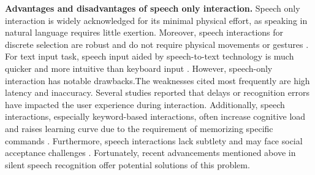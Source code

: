 \documentclass[review]{fcs}
\newcommand{\revise}[2]{\textcolor[rgb]{0,0,0}{#2}}
\begin{document}
\textbf{Advantages and disadvantages of speech only interaction.} Speech only interaction is widely acknowledged for its minimal physical effort, as speaking in natural language requires little exertion\cite{DBLP:conf/vr/HombeckVHDL23}. 
\revise{Moreover, speech interactions for discrete selection are robust and require no physical movements or gestures \cite{DBLP:conf/ismar/ChenGFCL23}.For text input, speech aided by speech-to-text technology is much quicker and more intuitive than keyboard input \cite{DBLP:conf/vr/HombeckVHDL23}.}{Moreover, speech interactions for discrete selection are robust and do not require physical movements or gestures \cite{DBLP:conf/ismar/ChenGFCL23}. For text input task, speech input aided by speech-to-text technology is much quicker and more intuitive than keyboard input \cite{DBLP:conf/vr/HombeckVHDL23}.} However, speech-only interaction has notable drawbacks.\revise{The most frequently cited weaknesses are latency and inaccuracy.}{The weaknesses cited most frequently are high latency and inaccuracy.} 
\revise{Several studies reported that delays or recognition errors have impacted the user experience during the interaction\cite{DBLP:conf/vr/HombeckVHDL23, DBLP:conf/vr/SaintAubertAMPAL23, DBLP:conf/vr/JingLB22, DBLP:conf/ismar/MengXL22, DBLP:conf/uist/LiaoKJKS22}.}{Several studies\cite{DBLP:conf/vr/HombeckVHDL23, DBLP:conf/vr/SaintAubertAMPAL23, DBLP:conf/vr/JingLB22, DBLP:conf/ismar/MengXL22, DBLP:conf/uist/LiaoKJKS22} reported that delays or recognition errors have impacted the user experience during interaction.} Additionally, speech interactions, especially keyword-based interactions, often increase cognitive load and raises learning curve due to the requirement of memorizing specific commands \cite{DBLP:conf/ismar/ChenGFCL23}. Furthermore, speech interactions lack subtlety and may face social acceptance challenges \cite{DBLP:conf/chi/WangYWJ024, DBLP:conf/ismar/MengXL22}. Fortunately, recent advancements mentioned above in silent speech recognition offer potential solutions of this problem.

\end{document}
